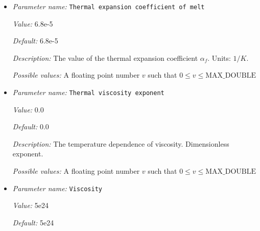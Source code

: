 \begin{itemize}
{\it Value:} 4e-5


{\it Default:} 4e-5


{\it Description:} The value of the thermal expansion coefficient $\alpha_s$. Units: $1/K$.


{\it Possible values:} A floating point number $v$ such that $0 \leq v \leq \text{MAX\_DOUBLE}$
\item {\it Parameter name:} {\tt Thermal expansion coefficient of melt}
\label{parameters:Material model/Latent heat melt/Thermal expansion coefficient of melt}
\label{parameters:Material_20model/Latent_20heat_20melt/Thermal_20expansion_20coefficient_20of_20melt}


{\it Value:} 6.8e-5


{\it Default:} 6.8e-5


{\it Description:} The value of the thermal expansion coefficient $\alpha_f$. Units: $1/K$.


{\it Possible values:} A floating point number $v$ such that $0 \leq v \leq \text{MAX\_DOUBLE}$
\item {\it Parameter name:} {\tt Thermal viscosity exponent}
\label{parameters:Material model/Latent heat melt/Thermal viscosity exponent}
\label{parameters:Material_20model/Latent_20heat_20melt/Thermal_20viscosity_20exponent}


{\it Value:} 0.0


{\it Default:} 0.0


{\it Description:} The temperature dependence of viscosity. Dimensionless exponent.


{\it Possible values:} A floating point number $v$ such that $0 \leq v \leq \text{MAX\_DOUBLE}$
\item {\it Parameter name:} {\tt Viscosity}
\label{parameters:Material model/Latent heat melt/Viscosity}
\label{parameters:Material_20model/Latent_20heat_20melt/Viscosity}


{\it Value:} 5e24


{\it Default:} 5e24



\end{itemize}
